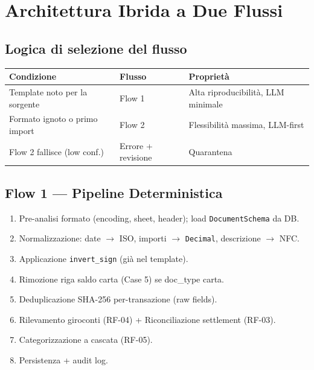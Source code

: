 \documentclass[11pt, a4paper]{article}
\begin{document}
\section{Architettura Ibrida a Due Flussi}

\subsection{Logica di selezione del flusso}

\begin{center}
\begin{tabular}{@{}L{4.5cm} L{4cm} L{4.5cm}@{}}
\toprule
\textbf{Condizione} & \textbf{Flusso} & \textbf{Proprietà} \\
\midrule
Template noto per la sorgente & Flow 1 & Alta riproducibilità, LLM minimale \\
Formato ignoto o primo import & Flow 2 & Flessibilità massima, LLM-first \\
Flow 2 fallisce (low conf.)   & Errore + revisione & Quarantena \\
\bottomrule
\end{tabular}
\end{center}

\subsection{Flow 1 --- Pipeline Deterministica}

\begin{enumerate}[leftmargin=2em]
  \item Pre-analisi formato (encoding, sheet, header); load \texttt{DocumentSchema} da DB.
  \item Normalizzazione: date $\to$ ISO, importi $\to$ \texttt{Decimal}, descrizione $\to$ NFC.
  \item Applicazione \texttt{invert\_sign} (già nel template).
  \item Rimozione riga saldo carta (Case 5) se doc\_type carta.
  \item Deduplicazione SHA-256 per-transazione (raw fields).
  \item Rilevamento giroconti (RF-04) + Riconciliazione settlement (RF-03).
  \item Categorizzazione a cascata (RF-05).
  \item Persistenza + audit log.
\end{enumerate}
\end{document}
